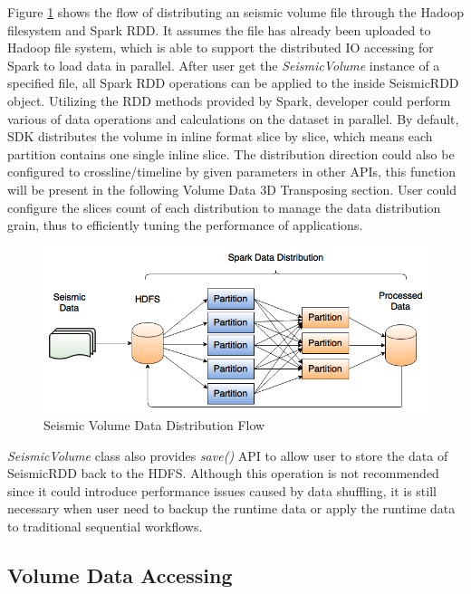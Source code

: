 Figure \ref{datadist} shows the flow of distributing an seismic volume file through the Hadoop filesystem and Spark RDD. It assumes the file has already been uploaded to Hadoop file system, which is able to support the distributed IO accessing for Spark to load data in parallel. After user get the  \emph{SeismicVolume} instance of a specified file,  all Spark RDD operations can be applied to the inside SeismicRDD object. Utilizing the RDD methods provided by Spark, developer could perform various of data operations and calculations on the dataset in parallel. By default, SDK distributes the volume in inline format slice by slice, which means each partition contains one single inline slice. The distribution direction could also be configured to crossline/timeline by given parameters in other APIs, this function will be present in the following Volume Data 3D Transposing section. User could configure the slices count of each distribution to manage the data distribution grain, thus to efficiently tuning the performance of applications.

\begin{figure}[h]
\centering
\includegraphics[scale=0.6]{figures/datadist.png}
\caption{Seismic Volume Data Distribution Flow}
\label{datadist}
\end{figure}

\emph{SeismicVolume} class also provides \emph{save()} API to allow user to store the data of SeismicRDD back to the HDFS. Although this operation is not recommended since it could introduce performance issues caused by data shuffling, it is still necessary when user need to backup the runtime data or apply the runtime data to traditional sequential workflows.


\subsection{Volume Data Accessing}

